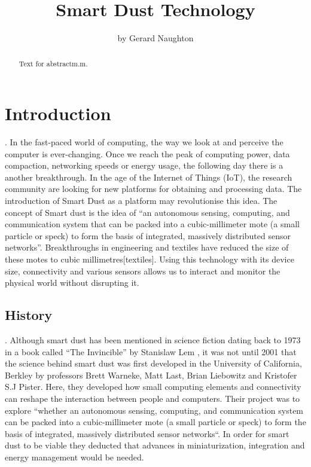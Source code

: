 \documentclass[article]{IEEEtran}
\begin{document}
\title{Smart Dust Technology }
\author{by Gerard Naughton }%

\maketitle

\begin{abstract}
Text for abstractm.m.
\end{abstract}


\section{Introduction}.\newline
In the fast-paced world of computing, the way we look at and perceive the computer is ever-changing. Once we reach the peak of computing power, data compaction, networking speeds or energy usage, the following day there is a another breakthrough. In the age of the Internet of Things (IoT)\cite{IOT}, the research community are looking for new platforms for obtaining and processing data. The introduction of Smart Dust as a platform may revolutionise this idea. 
The concept of Smart dust is the idea of  “an autonomous sensing, computing, and communication system that can be packed into a cubic-millimeter mote (a small particle or speck) to form the basis of integrated, massively distributed sensor networks”\cite{Mili}. Breakthroughs in engineering and textiles have reduced the size of these motes to cubic millimetres[textiles]. Using this technology with its device size, connectivity and various sensors allows us to interact and monitor the physical world without disrupting it.\cite{MobNet}


\subsection*{History}.\newline
Although smart dust has been mentioned in science fiction dating back to 1973 in a book called “The Invincible” by Stanislaw Lem \cite{lem1973invincible}, it was not until 2001 that the science behind smart dust was first developed in the University of California, Berkley by professors Brett Warneke, Matt Last, Brian Liebowitz and Kristofer S.J Pister. 
Here, they developed how small computing elements and connectivity can reshape the interaction between people and computers. Their project was to explore “whether an autonomous sensing, computing, and communication system can be packed into a cubic-millimeter mote (a small particle or speck) to form the basis of integrated, massively distributed sensor networks“\cite{Mili}. In order for smart dust to be viable they deducted that advances in miniaturization, integration and energy management would be needed. 
\end{document}
